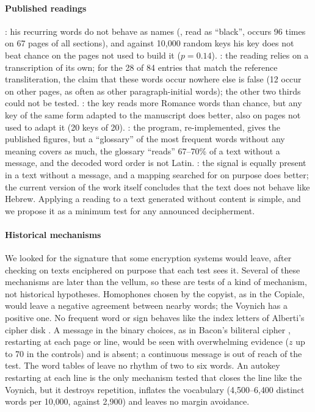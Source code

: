\paragraph{Published readings} \citet{bax2014}: his recurring words do not behave as names (, read as
``black'', occurs 96 times on 67 pages of all sections), and against 10{,}000 random keys his key does not beat chance on
the pages not used to build it ($p = 0.14$). \citet{vatne2021}: the reading relies on a transcription of its own; for
the 28 of 84 entries that match the reference transliteration, the claim that these words occur nowhere else is false (12
occur on other pages, as often as other paragraph-initial words); the other two thirds could not be tested.
\citet{cheshire2019}: the key reads more Romance words than chance, but any key of the same form adapted to the
manuscript does better, also on pages not used to adapt it (20 keys of 20). \citet{schechter2026}: the program,
re-implemented, gives the published figures, but a ``glossary'' of the most frequent words without any meaning covers as
much, the glossary ``reads'' 67--70\% of a text without a message, and the decoded word order is not Latin.
\citet{gatta2026}: the signal is equally present in a text without a message, and a mapping searched for on purpose does
better; the current version of the work itself concludes that the text does not behave like Hebrew. Applying a reading
to a text generated without content is simple, and we propose it as a minimum test for any announced decipherment.

\paragraph{Historical mechanisms} We looked for the signature that some encryption systems would leave, after checking on
texts enciphered on purpose that each test sees it. Several of these mechanisms are later than the vellum, so these are
tests of a kind of mechanism, not historical hypotheses. Homophones chosen by the copyist, as in the Copiale, would leave
a negative agreement between nearby words; the Voynich has a positive one. No frequent word or sign behaves like the
index letters of Alberti's cipher disk \citep[c.~1466;][]{alberti1466}. A message in the binary choices, as in Bacon's
biliteral cipher \citep{bacon1623}, restarting at each page or line, would be seen with overwhelming evidence ($z$ up to
70 in the controls) and is absent; a continuous message is out of reach of the test. The word tables of
\citet{trithemius1518} leave no rhythm of two to six words. An autokey restarting at each line is the only mechanism
tested that closes the line like the Voynich, but it destroys repetition, inflates the vocabulary (4{,}500--6{,}400
distinct words per 10{,}000, against 2{,}900) and leaves no margin avoidance.

